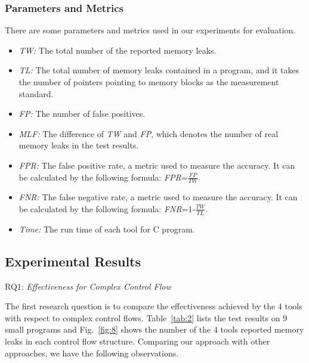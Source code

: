 \subsubsection{Parameters and Metrics}\label{ssec:pm}
There are some parameters and metrics used in our experiments for evaluation.
\begin{itemize}
\item \textit{TW:} The total number of the reported memory leaks.
\item \textit{TL:} The total number of memory leaks contained in a program, and it takes the number of pointers pointing to memory blocks as the measurement standard.
\item \textit{FP:} The number of false positives.
\item \textit{MLF:} The difference of \textit{TW} and \textit{FP}, which denotes the number of real memory leaks in the test results.
\item \textit{FPR:} The false positive rate, a metric used to measure the accuracy. It can be calculated by the following formula: \textit{FPR}=$\frac{\textit{FP}}{\textit{TW}}$.
\item \textit{FNR:} The false negative rate, a metric used to measure the accuracy. It can be calculated by the following formula: \textit{FNR}=1-$\frac{\textit{TW}}{\textit{TL}}$.
\item \textit{Time:} The run time of each tool for C program.
\end{itemize}

\subsection{Experimental Results}

\noindent RQ1: \textit{Effectiveness for Complex Control Flow}

The first research question is to compare the effectiveness achieved by the $4$ tools with respect to complex control flows. Table~\ref{tab:2} lists the test results on $9$ small programs and Fig.~\ref{fig:8} shows the number of the $4$ tools reported memory leaks in each control flow structure. Comparing our approach with other approaches, we have the following observations.

